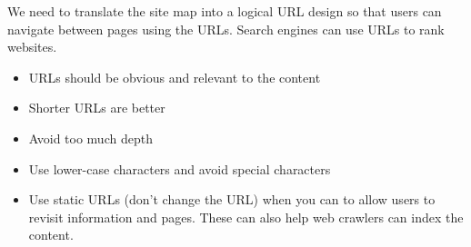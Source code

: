We need to translate the site map into a logical URL design so that users can navigate between pages using the URLs.
Search engines can use URLs to rank websites.
\begin{itemize}
    \item URLs should be obvious and relevant to the content
    \item Shorter URLs are better
    \item Avoid too much depth
    \item Use lower-case characters and avoid special characters
    \item Use static URLs (don't change the URL) when you can to allow users to revisit information and pages.
          These can also help web crawlers can index the content.
\end{itemize}
